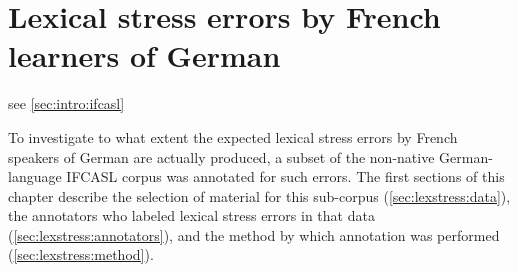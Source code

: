 %
%
\chapter{Lexical stress errors by French learners of German }
\label{chap:lexstress}



%	
	

	 see \cref{sec:intro:ifcasl}

	To investigate to what extent the expected lexical stress errors by French speakers of German are actually produced, a subset of the non-native German-language IFCASL corpus was annotated for such errors.
	The first sections of this chapter describe the selection of material for this sub-corpus (\cref{sec:lexstress:data}), the annotators who labeled lexical stress errors in that data (\cref{sec:lexstress:annotators}), and the method by which annotation was performed (\cref{sec:lexstress:method}). 
	
